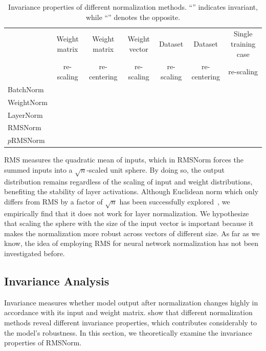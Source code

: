 \documentclass{article}
\newcommand{\cmark}{\ding{51}}
\newcommand{\xmark}{\ding{55}}
\begin{document}
\begin{table}[t]
\scriptsize
\centering
\begin{tabular}{l||c|c|c|c|c|c}

& {Weight matrix}& {Weight matrix} & {Weight vector}  & {Dataset} & {Dataset} & {Single training case}\\
& {re-scaling} & {re-centering} & {re-scaling} & {re-scaling} & {re-centering} & {re-scaling}\\
\hline
\hline
BatchNorm & \cmark & \xmark & \cmark & \cmark & \cmark & \xmark\\
WeightNorm & \cmark & \xmark & \cmark & \xmark & \xmark & \xmark\\
LayerNorm & \cmark & \cmark & \xmark & \cmark & \xmark & \cmark\\
\hline
\hline
RMSNorm & \cmark & \xmark & \xmark & \cmark & \xmark & \cmark \\
$p$RMSNorm & \cmark & \xmark & \xmark & \cmark & \xmark & \cmark \\
\end{tabular}
\caption{\label{tb_invariance} Invariance properties of different normalization methods. ``\cmark'' indicates invariant, while ``\xmark'' denotes the opposite.} 
\vspace{-0.22in}
\end{table}
RMS measures the quadratic mean of inputs, which in RMSNorm forces the summed inputs into a $\sqrt{n}$-scaled unit sphere. By doing so, the output distribution remains regardless of the scaling of input and weight distributions, benefiting the stability of layer activations. Although Euclidean norm which only differs from RMS by a factor of $\sqrt{n}$ has been successfully explored~\cite{NIPS2016_6114}, we empirically find that it does not work for layer normalization. We hypothesize that scaling the sphere with the size of the input vector is important because it makes the normalization more robust across vectors of different size. As far as we know, the idea of employing RMS for neural network normalization has not been investigated before.


\subsection{Invariance Analysis}

Invariance measures whether model output after normalization changes highly in accordance with its input and weight matrix. \citet{ba2016layer} show that different normalization methods reveal different invariance properties, which contributes considerably to the model's robustness. In this section, we theoretically examine the invariance properties of RMSNorm. 
\end{document}
